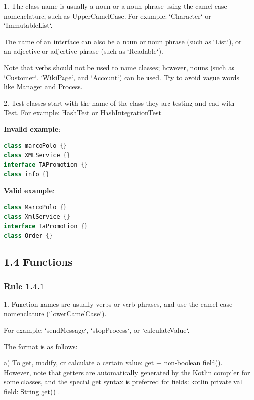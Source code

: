 1.	The class name is usually a noun or a noun phrase using the camel case nomenclature, such as UpperCamelCase. For example: `Character` or `ImmutableList`.

The name of an interface can also be a noun or noun phrase (such as `List`), or an adjective or adjective phrase (such as `Readable`).

Note that verbs should not be used to name classes; however, nouns (such as `Customer`, `WikiPage`, and `Account`) can be used. Try to avoid vague words like Manager and Process.



2.	Test classes start with the name of the class they are testing and end with Test. For example: HashTest or HashIntegrationTest



\textbf{Invalid example}: 

\begin{lstlisting}[language=Kotlin]
class marcoPolo {} 
class XMLService {} 
interface TAPromotion {}
class info {}
\end{lstlisting}


\textbf{Valid example}: 

\begin{lstlisting}[language=Kotlin]
class MarcoPolo {}
class XmlService {}
interface TaPromotion {}
class Order {}
\end{lstlisting}


\subsection*{\textbf{1.4 Functions}}

\subsubsection*{\textbf{Rule 1.4.1}}
\leavevmode\newline



1.	Function names are usually verbs or verb phrases, and use the camel case nomenclature (`lowerCamelCase`).

For example: `sendMessage`, `stopProcess`, or `calculateValue`.

The format is as follows:



a) To get, modify, or calculate a certain value: get + non-boolean field(). However, note that getters are automatically generated by the Kotlin compiler for some classes, and the special get syntax is preferred for fields: kotlin private val field: String get() { }.


